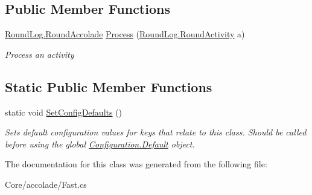 \subsection*{Public Member Functions}
\begin{DoxyCompactItemize}
\item 
\hypertarget{class_m_b_c_1_1_core_1_1mbc_1_1accolade_1_1_fast_a889ec0b12577dc5ca345d281f00fbba2}{\hyperlink{class_m_b_c_1_1_core_1_1_round_log_a4060830ca7135aa755ec5b6d24aa30e6}{Round\-Log.\-Round\-Accolade} \hyperlink{class_m_b_c_1_1_core_1_1mbc_1_1accolade_1_1_fast_a889ec0b12577dc5ca345d281f00fbba2}{Process} (\hyperlink{class_m_b_c_1_1_core_1_1_round_log_1_1_round_activity}{Round\-Log.\-Round\-Activity} a)}\label{class_m_b_c_1_1_core_1_1mbc_1_1accolade_1_1_fast_a889ec0b12577dc5ca345d281f00fbba2}

\begin{DoxyCompactList}\small\item\em Process an activity\end{DoxyCompactList}\end{DoxyCompactItemize}
\subsection*{Static Public Member Functions}
\begin{DoxyCompactItemize}
\item 
\hypertarget{class_m_b_c_1_1_core_1_1mbc_1_1accolade_1_1_fast_acdc309640cc5b2ad9095319c764af59f}{static void \hyperlink{class_m_b_c_1_1_core_1_1mbc_1_1accolade_1_1_fast_acdc309640cc5b2ad9095319c764af59f}{Set\-Config\-Defaults} ()}\label{class_m_b_c_1_1_core_1_1mbc_1_1accolade_1_1_fast_acdc309640cc5b2ad9095319c764af59f}

\begin{DoxyCompactList}\small\item\em Sets default configuration values for keys that relate to this class. Should be called before using the global \hyperlink{class_m_b_c_1_1_core_1_1_configuration_a5db184730b6c51c2ae617d0fc1976c13}{Configuration.\-Default} object.\end{DoxyCompactList}\end{DoxyCompactItemize}


The documentation for this class was generated from the following file\-:\begin{DoxyCompactItemize}
\item 
Core/accolade/Fast.\-cs\end{DoxyCompactItemize}
